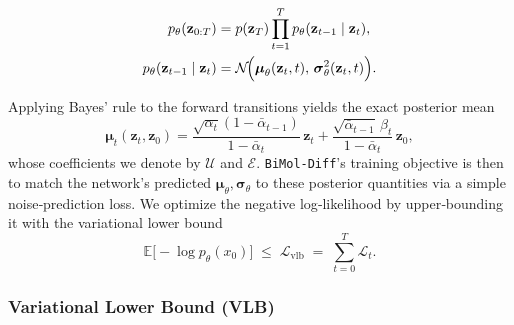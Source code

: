 \begin{equation}
\begin{aligned}
p_\theta(\mathbf{z}_{0:T})
&= p(\mathbf{z}_T)\prod_{t=1}^T p_\theta(\mathbf{z}_{t-1}\mid \mathbf{z}_t), \\
p_\theta(\mathbf{z}_{t-1}\mid \mathbf{z}_t)
&= \mathcal{N}\!\Bigl(\boldsymbol{\mu}_\theta(\mathbf{z}_t,t),\,\boldsymbol{\sigma}_\theta^2(\mathbf{z}_t,t)\Bigr).
\end{aligned}
\end{equation}

Applying Bayes’ rule to the forward transitions yields the exact posterior mean
\begin{equation}
\boldsymbol{\mu}_t(\mathbf{z}_t,\mathbf{z}_0)
= \frac{\sqrt{\alpha_t}(1-\bar\alpha_{t-1})}{1-\bar\alpha_t}\,\mathbf{z}_t
  + \frac{\sqrt{\bar\alpha_{t-1}}\,\beta_t}{1-\bar\alpha_t}\,\mathbf{z}_0,
\end{equation}
whose coefficients we denote by \(\mathcal{U}\) and \(\mathcal{E}\).  \texttt{BiMol-Diff}’s training objective is then to match the network’s predicted \(\boldsymbol{\mu}_\theta,\boldsymbol{\sigma}_\theta\) to these posterior quantities via a simple noise‐prediction loss. 
We optimize the negative log‐likelihood by upper‐bounding it with the variational lower bound
\begin{equation}
\mathbb{E}\bigl[-\log p_\theta(x_0)\bigr]
\;\le\;
\mathcal{L}_{\mathrm{vlb}}
\;=\;
\sum_{t=0}^T \mathcal{L}_t.
\end{equation}

\subsubsection{Variational Lower Bound (VLB)}

